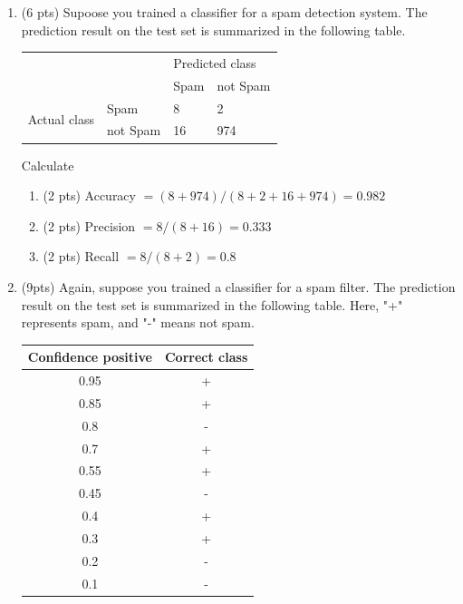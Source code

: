 \documentclass[a4paper]{article}
\theoremstyle{definition}
\newenvironment{soln}{
    \leavevmode\color{blue}\ignorespaces
}{}
\begin{document}
\begin{enumerate}
\item (6 pts) Supoose you trained a classifier for a spam detection system. The prediction result on the test set is summarized in the following table.
\begin{center}
	\begin{tabular}{l l | l l}
		&          & \multicolumn{2}{l}{Predicted class} \\
		&          & Spam           & not Spam           \\
		\hline
		\multirow{2}{*}{Actual class} & Spam     & 8              & 2                  \\
		& not Spam & 16             & 974               
	\end{tabular}
\end{center}

Calculate
\begin{enumerate}
	\item (2 pts) Accuracy
	\begin{soln}  $= (8+974)/(8+2+16+974)= 0.982$\end{soln}
	\item (2 pts) Precision
	\begin{soln}  $=8/(8+16)= 0.333$\end{soln}
	\item (2 pts) Recall
	\begin{soln}  $=8/(8+2) = 0.8$ \end{soln}
\end{enumerate}


\item (9pts) Again, suppose you trained a classifier for a spam filter. The prediction result on the test set is summarized in the following table. Here, "+" represents spam, and "-" means not spam.

\begin{center}
\begin{tabular}{ c  c }
\hline
Confidence positive & Correct class \\ \hline
0.95 & + \\
0.85 & + \\
0.8 & - \\
0.7 & + \\
0.55 & + \\
0.45 & - \\
0.4 & + \\
0.3 & + \\
0.2 & - \\
0.1 & - \\
\hline
\end{tabular}
\end{center}


\end{enumerate}
\end{document}

